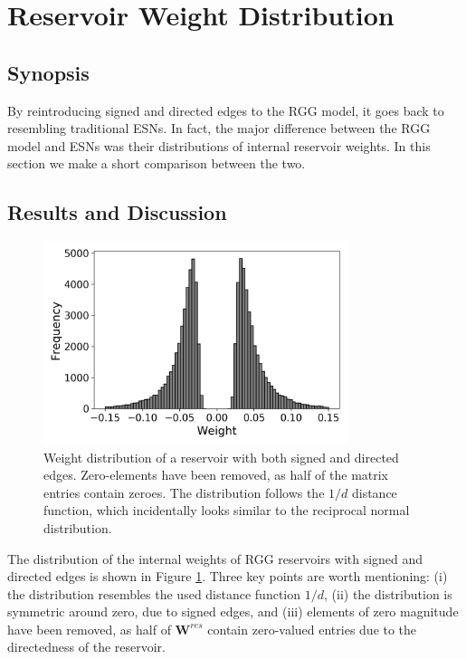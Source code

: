 \section{Reservoir Weight Distribution}

\subsection{Synopsis}

By reintroducing signed and directed edges to the RGG model, it goes back to
resembling traditional ESNs. In fact, the major difference between the RGG model
and ESNs was their distributions of internal reservoir weights. In this section
we make a short comparison between the two.

\subsection{Results and Discussion}

\begin{figure}[t]
  \centering
  \includegraphics[width=3.5in]{figures/rgg-dist.png}
  \caption{
    Weight distribution of a reservoir with both signed and directed
edges. Zero-elements have been removed, as half of the matrix entries contain
zeroes. The distribution follows the $1/d$ distance function, which incidentally
looks similar to the reciprocal normal distribution.
  }
  \label{fig:rgg-dist}
\end{figure}

The distribution of the internal weights of RGG reservoirs with signed and
directed edges is shown in Figure \ref{fig:rgg-dist}. Three key points are worth
mentioning: (i) the distribution resembles the used distance function $1/d$,
(ii) the distribution is symmetric around zero, due to signed edges, and (iii)
elements of zero magnitude have been removed, as half of $\mathbf{W}^{res}$
contain zero-valued entries due to the directedness of the reservoir.

